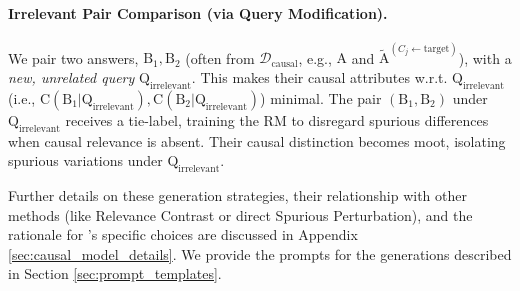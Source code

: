 \vspace{-0.1in}
\paragraph{Irrelevant Pair Comparison (via Query Modification).}
We pair two answers, $\mathrm{B}_1, \mathrm{B}_2$ (often from $\mathcal{D}_{\mathrm{causal}}$, e.g., $\mathrm{A}$ and $\tilde{\mathrm{A}}^{(C_j \leftarrow \text{target})}$), with a \textit{new, unrelated query} $\mathrm{Q}_{\text{irrelevant}}$. This makes their causal attributes w.r.t. $\mathrm{Q}_{\text{irrelevant}}$ (i.e., $\mathrm{C(B_1|Q_{\text{irrelevant}})}, \mathrm{C(B_2|Q_{\text{irrelevant}})}$) minimal. The pair $(\mathrm{B}_1, \mathrm{B}_2)$ under $\mathrm{Q}_{\text{irrelevant}}$ receives a tie-label, training the RM to disregard spurious differences when causal relevance is absent. Their causal distinction becomes moot, isolating spurious variations under $\mathrm{Q}_{\text{irrelevant}}$.




\vspace{-0.05in}
Further details on these generation strategies, their relationship with other methods (like Relevance Contrast or direct Spurious Perturbation), and the rationale for \carma{}'s specific choices are discussed in Appendix \ref{sec:causal_model_details}. 
We provide the prompts for the generations described in Section \ref{sec:prompt_templates}.